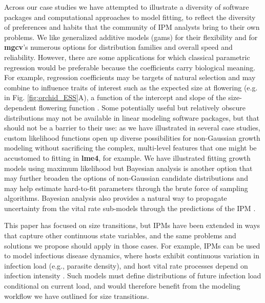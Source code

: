 \documentclass[12pt]{article}
\begin{document}
Across our case studies we have attempted to illustrate a diversity of software packages and computational approaches to model fitting, to reflect the diversity of preferences and habits that the community of IPM analysts bring to their own problems. 
We like generalized additive models (gams) for their flexibility and for \textbf{mgcv}'s numerous options for distribution families and overall speed and reliability. 
However, there are some applications for which classical parametric regression would be preferable because the coefficients carry biological meaning.
For example, regression coefficients may be targets of natural selection \citep{rees2016evolving} and may combine to influence traits of interest such as the expected size at flowering (e.g. in Fig. \ref{fig:orchid_ESS}A), a function of the intercept and slope of the size-dependent flowering function \citep{metcalf2003evolutionary}. 
Some potentially useful but relatively obscure distributions may not be available in linear modeling software packages, but that should not be a barrier to their use: as we have illustrated in several case studies, custom likelihood functions open up diverse possibilities for non-Gaussian growth modeling without sacrificing the complex, multi-level features that one might be accustomed to fitting in \textbf{lme4}, for example. 
We have illustrated fitting growth models using maximum likelihood but Bayesian analysis is another option that may further broaden the options of non-Gaussian candidate distributions and may help estimate hard-to-fit parameters through the brute force of sampling algorithms. 
Bayesian analysis also provides a natural way to propagate uncertainty from the vital rate sub-models through the predictions of the IPM \citep{elderd2016quantifying}. 

This paper has focused on size transitions, but IPMs have been extended in ways that capture other continuous state variables, and the same problems and solutions we propose should apply in those cases. 
For example, IPMs can be used to model infectious disease dynamics, where hosts exhibit continuous variation in infection load (e.g., parasite density), and host vital rate processes depend on infection intensity \citep{metcalf2016opportunities,wilber2016integral}. 
Such models must define distributions of future infection load conditional on current load, and would therefore benefit from the modeling workflow we have outlined for size transitions.
\end{document}
